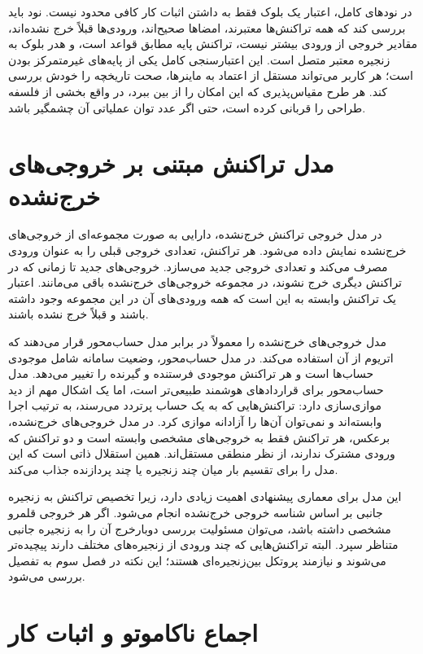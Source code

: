 در نودهای کامل، اعتبار یک بلوک فقط به داشتن اثبات کار کافی محدود نیست. نود باید بررسی کند که همه تراکنش‌ها معتبرند، امضاها صحیح‌اند، ورودی‌ها قبلاً خرج نشده‌اند، مقادیر خروجی از ورودی بیشتر نیست، تراکنش پایه مطابق قواعد است، و هدر بلوک به زنجیره معتبر متصل است. این اعتبارسنجی کامل یکی از پایه‌های غیرمتمرکز بودن است؛ هر کاربر می‌تواند مستقل از اعتماد به ماینرها، صحت تاریخچه را خودش بررسی کند. هر طرح مقیاس‌پذیری که این امکان را از بین ببرد، در واقع بخشی از فلسفه طراحی را قربانی کرده است، حتی اگر عدد توان عملیاتی آن چشمگیر باشد.

\section{مدل تراکنش مبتنی بر خروجی‌های خرج‌نشده}

در مدل خروجی تراکنش خرج‌نشده، دارایی به صورت مجموعه‌ای از خروجی‌های خرج‌نشده نمایش داده می‌شود. هر تراکنش، تعدادی خروجی قبلی را به عنوان ورودی مصرف می‌کند و تعدادی خروجی جدید می‌سازد. خروجی‌های جدید تا زمانی که در تراکنش دیگری خرج نشوند، در مجموعه خروجی‌های خرج‌نشده باقی می‌مانند. اعتبار یک تراکنش وابسته به این است که همه ورودی‌های آن در این مجموعه وجود داشته باشند و قبلاً خرج نشده باشند.

مدل خروجی‌های خرج‌نشده را معمولاً در برابر مدل حساب‌محور قرار می‌دهند که اتریوم از آن استفاده می‌کند. در مدل حساب‌محور، وضعیت سامانه شامل موجودی حساب‌ها است و هر تراکنش موجودی فرستنده و گیرنده را تغییر می‌دهد. مدل حساب‌محور برای قراردادهای هوشمند طبیعی‌تر است، اما یک اشکال مهم از دید موازی‌سازی دارد: تراکنش‌هایی که به یک حساب پرتردد می‌رسند، به ترتیب اجرا وابسته‌اند و نمی‌توان آن‌ها را آزادانه موازی کرد. در مدل خروجی‌های خرج‌نشده، برعکس، هر تراکنش فقط به خروجی‌های مشخصی وابسته است و دو تراکنش که ورودی مشترک ندارند، از نظر منطقی مستقل‌اند. همین استقلال ذاتی است که این مدل را برای تقسیم بار میان چند زنجیره یا چند پردازنده جذاب می‌کند.

این مدل برای معماری پیشنهادی اهمیت زیادی دارد، زیرا تخصیص تراکنش به زنجیره جانبی بر اساس شناسه خروجی خرج‌نشده انجام می‌شود. اگر هر خروجی قلمرو مشخصی داشته باشد، می‌توان مسئولیت بررسی دوبارخرج آن را به زنجیره جانبی متناظر سپرد. البته تراکنش‌هایی که چند ورودی از زنجیره‌های مختلف دارند پیچیده‌تر می‌شوند و نیازمند پروتکل بین‌زنجیره‌ای هستند؛ این نکته در فصل سوم به تفصیل بررسی می‌شود.

\section{اجماع ناکاموتو و اثبات کار}

